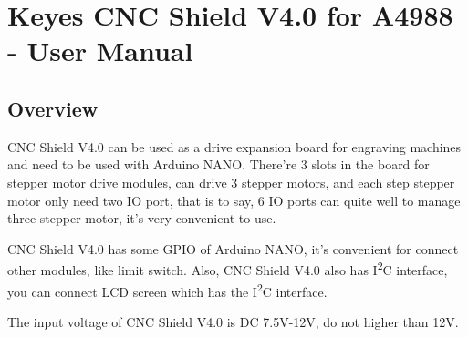 %
%








\chapter{Keyes CNC Shield V4.0 for A4988 - User Manual}

\section{Overview}

CNC Shield V4.0 can be used as a drive expansion board for engraving machines and need to be used with Arduino NANO. There're 3 slots in the board for stepper motor drive modules, can drive 3 stepper motors, and each step stepper motor only need two IO port, that is to say, 6 IO ports can quite well to manage three stepper motor, it’s very convenient to use.

CNC Shield V4.0 has some GPIO of Arduino NANO, it's convenient for connect other modules, like limit switch. Also, CNC Shield V4.0 also has I\textsuperscript{2}C interface, you can connect LCD screen which has the I\textsuperscript{2}C interface.

The input voltage of CNC Shield V4.0 is DC 7.5V-12V, do not higher than 12V.


\begin{center}
	
\end{center}



